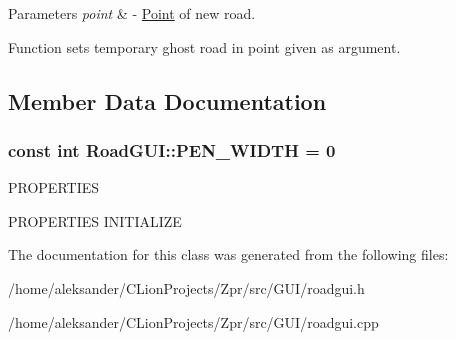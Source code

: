 \begin{DoxyParams}{Parameters}
{\em point} & -\/ \hyperlink{classPoint}{Point} of new road.\\
\hline
\end{DoxyParams}
Function sets temporary ghost road in point given as argument. 

\subsection{Member Data Documentation}
\hypertarget{classRoadGUI_a998dae57fd63610094da9e39f13c61c1}{
\subsubsection[{P\-E\-N\-\_\-\-W\-I\-D\-T\-H}]{\setlength{\rightskip}{0pt plus 5cm}const int Road\-G\-U\-I\-::\-P\-E\-N\-\_\-\-W\-I\-D\-T\-H = 0\hspace{0.3cm}{\ttfamily [static]}}}\label{classRoadGUI_a998dae57fd63610094da9e39f13c61c1}
P\-R\-O\-P\-E\-R\-T\-I\-E\-S

P\-R\-O\-P\-E\-R\-T\-I\-E\-S I\-N\-I\-T\-I\-A\-L\-I\-Z\-E 

The documentation for this class was generated from the following files\-:\begin{DoxyCompactItemize}
\item 
/home/aleksander/\-C\-Lion\-Projects/\-Zpr/src/\-G\-U\-I/roadgui.\-h\item 
/home/aleksander/\-C\-Lion\-Projects/\-Zpr/src/\-G\-U\-I/roadgui.\-cpp\end{DoxyCompactItemize}
